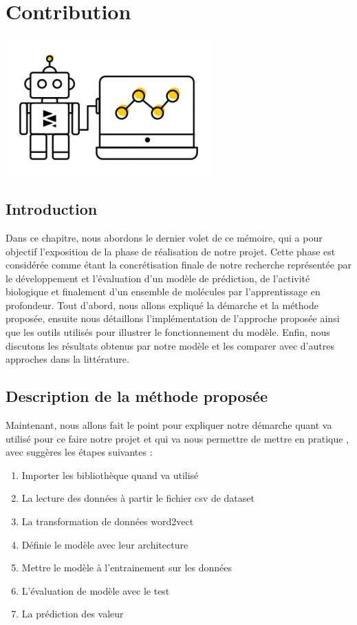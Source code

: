 \documentclass[12pt]{report}
\begin{document}
\chapter{Contribution}
\begin{center}
\includegraphics[width=300]{Machina.jpg}

\end{center}
\newpage
\section{Introduction}
Dans ce chapitre, nous abordons le dernier volet de ce mémoire, qui a pour objectif l'exposition de la phase de réalisation de notre projet. Cette phase est considérée comme étant la concrétisation finale de notre recherche représentée par le développement et l'évaluation d'un modèle de prédiction, de l'activité biologique et finalement d'un ensemble de molécules par l'apprentissage en profondeur. Tout d'abord, nous allons expliqué la démarche et la méthode proposée, ensuite nous détaillons l'implémentation de l'approche proposée ainsi que les outils utilisés pour illustrer le fonctionnement du modèle. Enfin, nous discutons les résultats obtenus par notre modèle et les comparer avec d'autres approches dans la littérature.    

\section{Description de la méthode proposée}
Maintenant, nous allons fait le point pour expliquer notre démarche quant va utilisé pour ce faire notre projet  et qui va nous permettre de mettre en pratique , avec suggères les étapes suivantes :\\
\begin{enumerate}
\item Importer les bibliothèque quand va utilisé
\item La lecture des données à partir le fichier csv de dataset
\item La transformation de données word2vect
\item Définie le modèle avec leur architecture 
\item Mettre le modèle à l'entrainement sur les données
\item L'évaluation de modèle avec le test
\item La prédiction des valeur 
\end{enumerate}
\newpage
\end{document}
